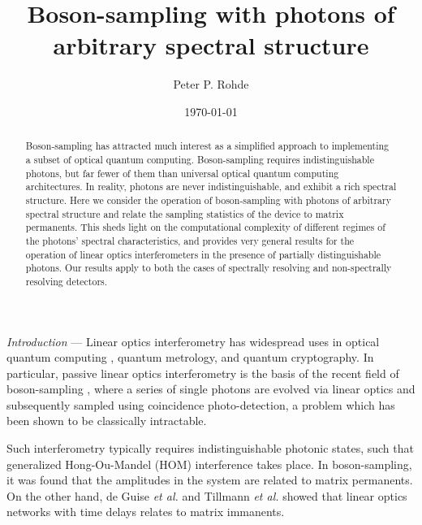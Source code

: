 \documentclass[aps,prl,twocolumn,amsmath,amssymb,nofootinbib,superscriptaddress]{revtex4}
\begin{document}


%
%

\title{Boson-sampling with photons of arbitrary spectral structure}

%
%

\author{Peter P. Rohde}

\date{\today}

\frenchspacing

%
%

\begin{abstract}
Boson-sampling has attracted much interest as a simplified approach to implementing a subset of optical quantum computing. Boson-sampling requires indistinguishable photons, but far fewer of them than universal optical quantum computing architectures. In reality, photons are never indistinguishable, and exhibit a rich spectral structure. Here we consider the operation of boson-sampling with photons of arbitrary spectral structure and relate the sampling statistics of the device to matrix permanents. This sheds light on the computational complexity of different regimes of the photons' spectral characteristics, and provides very general results for the operation of linear optics interferometers in the presence of partially distinguishable photons. Our results apply to both the cases of spectrally resolving and non-spectrally resolving detectors.
\end{abstract}

\maketitle

%
%

\emph{Introduction} --- Linear optics interferometry has widespread uses in optical quantum computing \cite{bib:KLM01, bib:KokLovett11, bib:NielsenChuang00}, quantum metrology, and quantum cryptography. In particular, passive linear optics interferometry is the basis of the recent field of boson-sampling \cite{bib:AaronsonArkhipov10}, where a series of single photons are evolved via linear optics and subsequently sampled using coincidence photo-detection, a problem which has been shown to be classically intractable.

Such interferometry typically requires indistinguishable photonic states, such that generalized Hong-Ou-Mandel (HOM) \cite{bib:HOM87, bib:RohdeRalph05} interference takes place. In boson-sampling, it was found that the amplitudes in the system are related to matrix permanents. On the other hand, de Guise \emph{et al.} \cite{bib:SandersImm} and Tillmann \emph{et al.} \cite{bib:TillmannImm14} showed that linear optics networks with time delays relates to matrix immanents.
\end{document}
